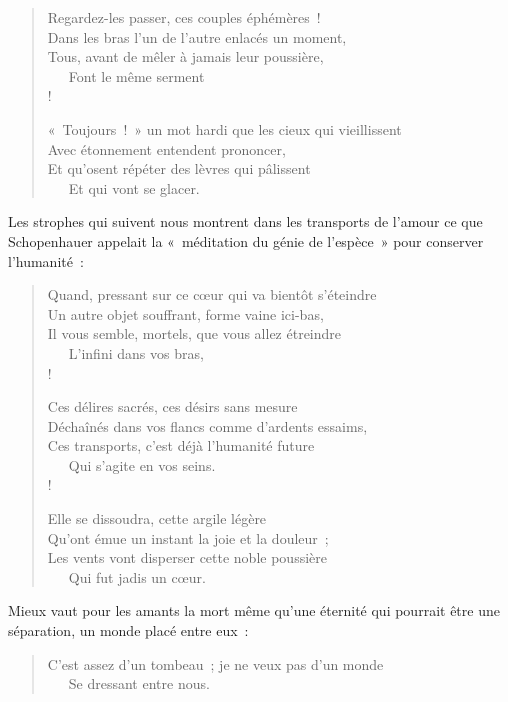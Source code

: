\documentclass[french,twoside]{book} %
\begin{document}
\begin{verse}
Regardez-les passer, ces couples éphémères !\\
Dans les bras l’un de l’autre enlacés un moment,\\
Tous, avant de mêler à jamais leur poussière,\\
   Font le même serment \\!

« Toujours ! » un mot hardi que les cieux qui vieillissent\\
Avec étonnement entendent prononcer,\\
Et qu’osent répéter des lèvres qui pâlissent\\
   Et qui vont se glacer.\\
\end{verse}

\noindent Les strophes qui suivent nous montrent dans les transports de l’amour ce que Schopenhauer appelait la « méditation du génie de l’espèce » pour conserver l’humanité :\par


\begin{verse}
Quand, pressant sur ce cœur qui va bientôt s’éteindre\\
Un autre objet souffrant, forme vaine ici-bas,\\
Il vous semble, mortels, que vous allez étreindre\\
   L’infini dans vos bras,\\!

Ces délires sacrés, ces désirs sans mesure\\
Déchaînés dans vos flancs comme d’ardents essaims,\\
Ces transports, c’est déjà l’humanité future\\
   Qui s’agite en vos seins.\\!

Elle se dissoudra, cette argile légère\\
Qu’ont émue un instant la joie et la douleur ;\\
Les vents vont disperser cette noble poussière\\
   Qui fut jadis un cœur.\\
\end{verse}

\noindent Mieux vaut pour les amants la mort même qu’une éternité qui pourrait être une séparation, un monde placé entre eux :\par


\begin{verse}
C’est assez d’un tombeau ; je ne veux pas d’un monde\\
   Se dressant entre nous.\\
\end{verse}
\end{document}
